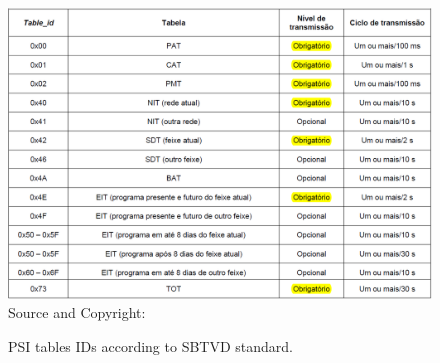 \documentclass[
	12pt,				%
	openright,			%
	twoside,			%
	a4paper,			%
	brazil,
	french,				%
	english
	]{abntex2}
\begin{document}
\begin{anexosenv}
\begin{figure}[!hb]
\centering
\caption{PSI tables IDs according to SBTVD standard.}
\includegraphics[width=0.7\linewidth]{figuras/tab_psi_tables_ids_level_frequency_abnt.png}
\\Source and Copyright: 
\label{fig:tab_psi_tables_ids_level_frequency}
\end{figure}



\end{anexosenv}

\printindex
\end{document}
